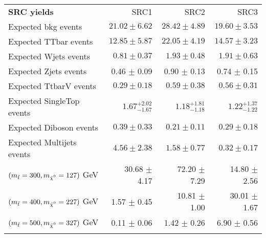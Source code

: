 

\begin{table}
\begin{center}
\setlength{\tabcolsep}{0.0pc}
{\small
\begin{tabular*}{\textwidth}{@{\extracolsep{\fill}}lrrr}
\noalign{\smallskip}\hline\noalign{\smallskip}
{\bf SRC yields}           & SRC1            & SRC2            & SRC3              \\[-0.05cm]
\noalign{\smallskip}\hline\noalign{\smallskip}
Expected bkg events         & $21.02 \pm 6.62$          & $28.42 \pm 4.89$          & $19.60 \pm 3.53$              \\
\noalign{\smallskip}\hline\noalign{\smallskip}
        Expected TTbar events         & $12.85 \pm 5.87$          & $22.05 \pm 4.19$          & $14.57 \pm 3.23$              \\
        Expected Wjets events         & $0.81 \pm 0.37$          & $1.93 \pm 0.48$          & $1.91 \pm 0.63$              \\
        Expected Zjets events         & 0.46 $\pm$ 0.09          & 0.90 $\pm$ 0.13          &  0.74 $\pm$ 0.15               \\
        Expected TtbarV events         & $0.29 \pm 0.18$          & $0.59 \pm 0.38$          & $0.56 \pm 0.31$              \\
        Expected SingleTop events         & $1.67_{-1.67}^{+2.02}$          & $1.18_{-1.18}^{+1.81}$          & $1.22_{-1.22}^{+1.37}$              \\
        Expected Diboson events         & $0.39 \pm 0.33$          & $0.21 \pm 0.11$          & $0.29 \pm 0.18$              \\
        Expected Multijets events         & $4.56 \pm 2.38$          & $1.58 \pm 0.77$          & $0.32 \pm 0.17$              \\
 \noalign{\smallskip}\hline\noalign{\smallskip}
$(\mstop = 300, \mLSP = 127)$ GeV & 30.68 $\pm$ 4.17 & 72.20 $\pm$ 7.29 & 14.80 $\pm$ 2.56 \\
$(\mstop = 400, \mLSP = 227)$ GeV & 1.57 $\pm$ 0.45  & 10.81 $\pm$ 1.00 & 30.01 $\pm$ 1.67 \\
$(\mstop = 500, \mLSP = 327)$ GeV & 0.11 $\pm$ 0.06  & 1.42 $\pm$ 0.26  & 6.90 $\pm$ 0.56 \\
 \noalign{\smallskip}\hline\noalign{\smallskip}


\end{tabular*}}
\end{center}
\end{table}
